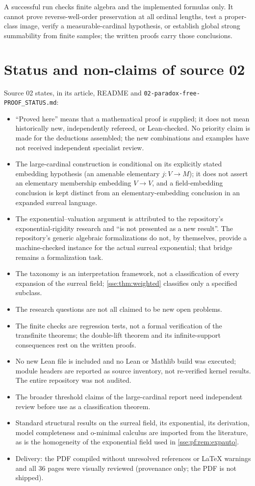 \documentclass[11pt,a4paper]{article}
\numberwithin{equation}{section}
\theoremstyle{plain}
\theoremstyle{definition}
\theoremstyle{remark}
\newcommand{\fn}[1]{\nolinkurl{#1}}%
\begin{document}
A successful run checks finite algebra and the implemented formulas only.
It cannot prove reverse-well-order preservation at all ordinal lengths,
test a proper-class image, verify a measurable-cardinal hypothesis, or
establish global strong summability from finite samples; the written
proofs carry those conclusions.

\section{Status and non-claims of source 02}\label{sse:pf:sec:status}

Source 02 states, in its article, README and \fn{02-paradox-free-PROOF_STATUS.md}:
\begin{itemize}
\item ``Proved here'' means that a mathematical proof is supplied; it does
not mean historically new, independently refereed, or Lean-checked. No
priority claim is made for the deductions assembled; the new combinations
and examples have not received independent specialist review.
\item The large-cardinal construction is conditional on its explicitly
stated embedding hypothesis (an amenable elementary $j:V\to M$); it does not
assert an elementary membership embedding $V\to V$, and a field-embedding
conclusion is kept distinct from an elementary-embedding conclusion in an
expanded surreal language.
\item The exponential--valuation argument is attributed to the repository's
exponential-rigidity research and ``is not presented as a new result''. The
repository's generic algebraic formalizations do not, by themselves,
provide a machine-checked instance for the actual surreal exponential; that
bridge remains a formalization task.
\item The taxonomy is an interpretation framework, not a classification of
every expansion of the surreal field; \cref{sse:thm:weighted} classifies
only a specified subclass.
\item The research questions are not all claimed to be new open problems.
\item The finite checks are regression tests, not a formal verification of
the transfinite theorems; the double-lift theorem and its infinite-support
consequences rest on the written proofs.
\item No new Lean file is included and no Lean or Mathlib build was
executed; module headers are reported as source inventory, not re-verified
kernel results. The entire repository was not audited.
\item The broader threshold claims of the large-cardinal report need
independent review before use as a classification theorem.
\item Standard structural results on the surreal field, its exponential,
its derivation, model completeness and o-minimal calculus are imported from
the literature, as is the homogeneity of the exponential field used in
\cref{sse:pf:rem:expauto}.
\item Delivery: the PDF compiled without unresolved references or LaTeX
warnings and all 36 pages were visually reviewed (provenance only; the PDF
is not shipped).
\end{itemize}
\end{document}
